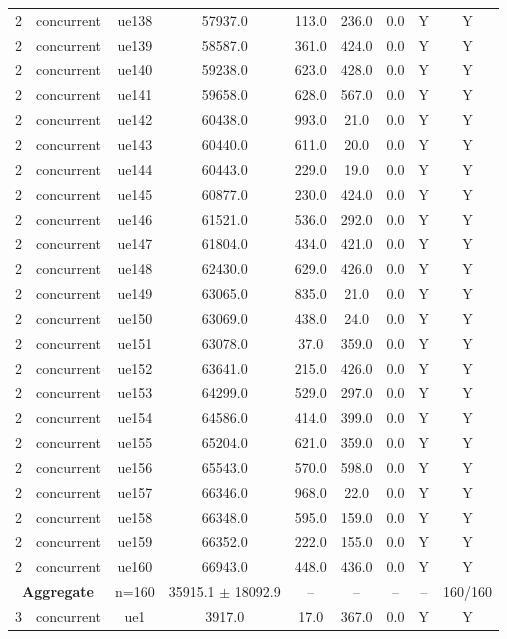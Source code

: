 \begin{table}[ht]
\begin{tabular}{|c|c|c|c|c|c|c|c|c|}
2 & concurrent & ue138 & 57937.0 & 113.0 & 236.0 & 0.0 & Y & Y \\
2 & concurrent & ue139 & 58587.0 & 361.0 & 424.0 & 0.0 & Y & Y \\
2 & concurrent & ue140 & 59238.0 & 623.0 & 428.0 & 0.0 & Y & Y \\
2 & concurrent & ue141 & 59658.0 & 628.0 & 567.0 & 0.0 & Y & Y \\
2 & concurrent & ue142 & 60438.0 & 993.0 & 21.0 & 0.0 & Y & Y \\
2 & concurrent & ue143 & 60440.0 & 611.0 & 20.0 & 0.0 & Y & Y \\
2 & concurrent & ue144 & 60443.0 & 229.0 & 19.0 & 0.0 & Y & Y \\
2 & concurrent & ue145 & 60877.0 & 230.0 & 424.0 & 0.0 & Y & Y \\
2 & concurrent & ue146 & 61521.0 & 536.0 & 292.0 & 0.0 & Y & Y \\
2 & concurrent & ue147 & 61804.0 & 434.0 & 421.0 & 0.0 & Y & Y \\
2 & concurrent & ue148 & 62430.0 & 629.0 & 426.0 & 0.0 & Y & Y \\
2 & concurrent & ue149 & 63065.0 & 835.0 & 21.0 & 0.0 & Y & Y \\
2 & concurrent & ue150 & 63069.0 & 438.0 & 24.0 & 0.0 & Y & Y \\
2 & concurrent & ue151 & 63078.0 & 37.0 & 359.0 & 0.0 & Y & Y \\
2 & concurrent & ue152 & 63641.0 & 215.0 & 426.0 & 0.0 & Y & Y \\
2 & concurrent & ue153 & 64299.0 & 529.0 & 297.0 & 0.0 & Y & Y \\
2 & concurrent & ue154 & 64586.0 & 414.0 & 399.0 & 0.0 & Y & Y \\
2 & concurrent & ue155 & 65204.0 & 621.0 & 359.0 & 0.0 & Y & Y \\
2 & concurrent & ue156 & 65543.0 & 570.0 & 598.0 & 0.0 & Y & Y \\
2 & concurrent & ue157 & 66346.0 & 968.0 & 22.0 & 0.0 & Y & Y \\
2 & concurrent & ue158 & 66348.0 & 595.0 & 159.0 & 0.0 & Y & Y \\
2 & concurrent & ue159 & 66352.0 & 222.0 & 155.0 & 0.0 & Y & Y \\
2 & concurrent & ue160 & 66943.0 & 448.0 & 436.0 & 0.0 & Y & Y \\
\multicolumn{2}{|c|}{\textbf{Aggregate}} & n=160 & 35915.1 $\pm$ 18092.9 & -- & -- & -- & -- & 160/160 \\
\hline
3 & concurrent & ue1 & 3917.0 & 17.0 & 367.0 & 0.0 & Y & Y \\

\end{tabular}
\end{table}
